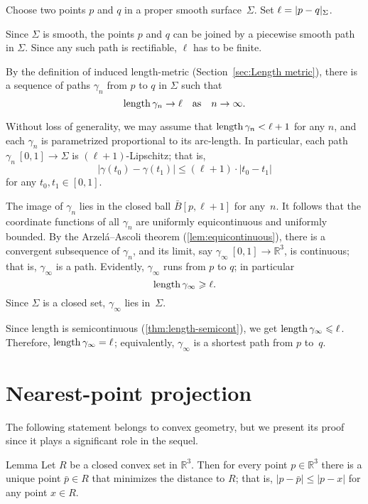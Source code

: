 {
Choose two points $p$ and $q$ in a proper smooth surface~$\Sigma$.
Set $\ell=\dist{p}{q}\Sigma$.

Since $\Sigma$ is smooth, the points $p$ and $q$ can be joined by a piecewise smooth path in $\Sigma$.
Since any such path is rectifiable, $\ell$ has to be finite.

By the definition of induced length-metric (Section~\ref{sec:Length metric}),
there is a sequence of paths $\gamma_n$ from $p$ to $q$ in $\Sigma$ such that
\[\mathop{\rm length}\nolimits\gamma_n\to \ell\quad\text{as}\quad n\to \infty.\]

Without loss of generality, we may assume that $\mathop{\rm length}\nolimits\gamma_n<\ell+1$ for any $n$, and each $\gamma_n$ is parametrized proportional to its arc-length.
In particular, each path $\gamma_n\:[0,1]\to\Sigma$ is $(\ell+1)$-Lipschitz; 
that is,
\[|\gamma(t_0)-\gamma(t_1)|\le (\ell+1)\cdot|t_0-t_1|\]
for any $t_0,t_1\in[0,1]$.

The image of $\gamma_n$ lies in the closed ball $\bar B[p,\ell+1]$ for any~$n$.
It follows that the coordinate functions of all $\gamma_n$ are uniformly equicontinuous and uniformly bounded.
By the Arzel\'{a}--Ascoli theorem (\ref{lem:equicontinuous}),
 there is a convergent subsequence of $\gamma_n$, and its limit, say $\gamma_\infty\:[0,1]\to\mathbb{R}^3$, is continuous;
that is, $\gamma_\infty$ is a path.
Evidently, $\gamma_\infty$ runs from $p$ to $q$;
in particular
\[\mathop{\rm length}\nolimits\gamma_\infty\geqslant \ell.\]
Since $\Sigma$ is a closed set, $\gamma_\infty$ lies in~$\Sigma$.

Since length is semicontinuous (\ref{thm:length-semicont}), we get $\mathop{\rm length}\nolimits\gamma_\infty\leqslant \ell$.
Therefore, $\length\gamma_\infty\z= \ell$; equivalently, $\gamma_\infty$ is a shortest path from $p$ to~$q$.
\qeds

\section{Nearest-point projection}

The following statement belongs to convex geometry,
but we present its proof since it plays a significant role in the sequel.

\begin{thm}{Lemma}\label{lem:nearest-point-projection}
Let $R$ be a closed convex set in $\mathbb{R}^3$.
Then for every point $p\in\mathbb{R}^3$ there is a unique point $\bar p\in R$ that minimizes the distance to $R$;
that is, $|p-\bar p|\le |p-x|$ for any point $x\in R$.


\end{thm}}
